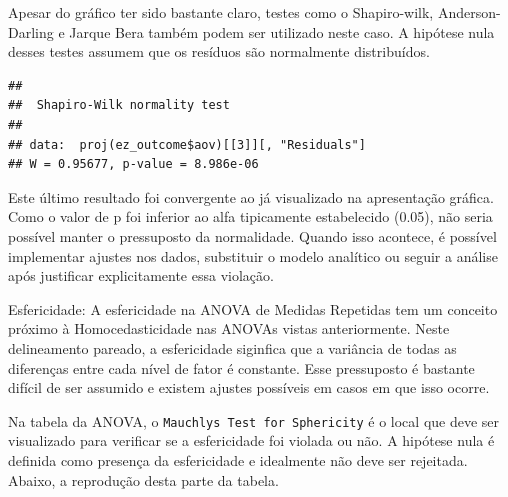 \documentclass[
]{book}
\newenvironment{Shaded}{\begin{snugshade}}{\end{snugshade}}
\newcommand{\DataTypeTok}[1]{\textcolor[rgb]{0.13,0.29,0.53}{#1}}
\newcommand{\DecValTok}[1]{\textcolor[rgb]{0.00,0.00,0.81}{#1}}
\newcommand{\KeywordTok}[1]{\textcolor[rgb]{0.13,0.29,0.53}{\textbf{#1}}}
\newcommand{\NormalTok}[1]{#1}
\newcommand{\OperatorTok}[1]{\textcolor[rgb]{0.81,0.36,0.00}{\textbf{#1}}}
\newcommand{\StringTok}[1]{\textcolor[rgb]{0.31,0.60,0.02}{#1}}
\begin{document}
Apesar do gráfico ter sido bastante claro, testes como o Shapiro-wilk, Anderson-Darling e Jarque Bera também podem ser utilizado neste caso. A hipótese nula desses testes assumem que os resíduos são normalmente distribuídos.

\begin{Shaded}
\end{Shaded}

\begin{verbatim}
## 
##  Shapiro-Wilk normality test
## 
## data:  proj(ez_outcome$aov)[[3]][, "Residuals"]
## W = 0.95677, p-value = 8.986e-06
\end{verbatim}

Este último resultado foi convergente ao já visualizado na apresentação gráfica. Como o valor de p foi inferior ao alfa tipicamente estabelecido (0.05), não seria possível manter o pressuposto da normalidade. Quando isso acontece, é possível implementar ajustes nos dados, substituir o modelo analítico ou seguir a análise após justificar explicitamente essa violação.

Esfericidade: A esfericidade na ANOVA de Medidas Repetidas tem um conceito próximo à Homocedasticidade nas ANOVAs vistas anteriormente. Neste delineamento pareado, a esfericidade siginfica que a variância de todas as diferenças entre cada nível de fator é constante. Esse pressuposto é bastante difícil de ser assumido e existem ajustes possíveis em casos em que isso ocorre.

Na tabela da ANOVA, o \texttt{Mauchly\textquotesingle{}s\ Test\ for\ Sphericity} é o local que deve ser visualizado para verificar se a esfericidade foi violada ou não. A hipótese nula é definida como presença da esfericidade e idealmente não deve ser rejeitada. Abaixo, a reprodução desta parte da tabela.

\begin{Shaded}
\end{Shaded}
\end{document}
